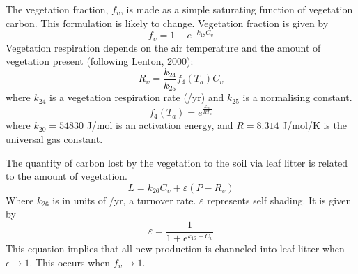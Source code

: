 \documentclass[10pt,a4paper]{report}
\begin{document}


The vegetation fraction, $f_{\upsilon}$, is made as a simple
saturating function of vegetation carbon. This formulation is
likely to change. Vegetation fraction is given by
\begin{equation}
f_{\upsilon}=1 - e^{-k_{17}C_{\upsilon}}
\end{equation}
Vegetation respiration depends on the air temperature and the
amount of vegetation present (following Lenton, 2000):
\begin{equation}
R_{\upsilon}=\frac{k_{24}}{k_{25}} f_4(T_a) C_{\upsilon}
\end{equation}
where  $k_{24}$ is a vegetation respiration rate (/yr) and $k_25$ is
a normalising constant.
\begin{displaymath}
f_4(T_a)=e^{\frac{k_{20}}{R T_a}}
\end{displaymath}
where $k_{20}=54830$ J/mol is an activation energy, and $R=8.314$
J/mol/K is the universal gas constant.


The quantity of carbon lost by the vegetation to the soil via leaf
litter is related to the amount of vegetation.
\begin{equation}
L=k_{26}C_{\upsilon}+ \varepsilon(P-R_{\upsilon})
\end{equation}
Where $k_{26}$ is in units of /yr, a turnover rate. $\varepsilon$
represents self shading. It is given by
\begin{equation}
\varepsilon=\frac{1}{1+e^{k_{16}-C_\upsilon}}
\end{equation}
This equation implies that all new production is channeled into leaf
litter when $\epsilon \rightarrow 1$. This occurs when $f_\upsilon
\rightarrow 1$.
\end{document}
